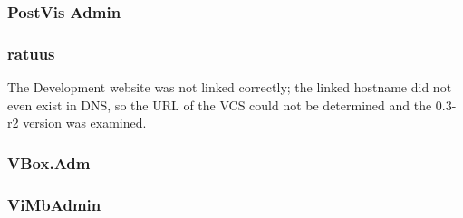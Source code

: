 \documentclass[12pt,a4paper]{scrartcl}
\begin{document}
			\subsubsection*{PostVis Admin}

			\subsubsection*{ratuus}

				The Development website was not linked correctly; the linked
				hostname did not even exist in DNS, so the URL of the VCS
				could not be determined and the 0.3-r2 version was examined.


			\subsubsection*{VBox.Adm}


			\subsubsection*{ViMbAdmin}
\end{document}
